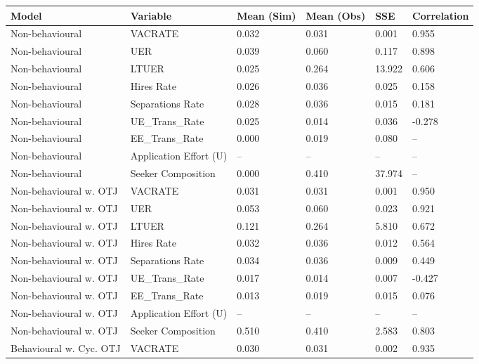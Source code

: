 \begin{table}[ht]
\centering
\begin{adjustbox}{width=\textwidth}
\begin{tabular}{llllll}
\toprule
Model & Variable & Mean (Sim) & Mean (Obs) & SSE & Correlation \\
\midrule
Non-behavioural & VACRATE & 0.032 & 0.031 & \cellcolor{yellow!25}0.001 & \cellcolor{yellow!25}0.955 \\
Non-behavioural & UER & 0.039 & 0.060 & 0.117 & 0.898 \\
Non-behavioural & LTUER & 0.025 & 0.264 & 13.922 & 0.606 \\
Non-behavioural & Hires Rate & 0.026 & 0.036 & 0.025 & 0.158 \\
Non-behavioural & Separations Rate & 0.028 & 0.036 & 0.015 & 0.181 \\
Non-behavioural & UE_Trans_Rate & 0.025 & 0.014 & 0.036 & -0.278 \\
Non-behavioural & EE_Trans_Rate & 0.000 & 0.019 & 0.080 & -- \\
Non-behavioural & Application Effort (U) & -- & -- & -- & -- \\
Non-behavioural & Seeker Composition & 0.000 & 0.410 & 37.974 & -- \\
Non-behavioural w. OTJ & VACRATE & \cellcolor{yellow!25}0.031 & 0.031 & 0.001 & 0.950 \\
Non-behavioural w. OTJ & UER & \cellcolor{yellow!25}0.053 & 0.060 & \cellcolor{yellow!25}0.023 & \cellcolor{yellow!25}0.921 \\
Non-behavioural w. OTJ & LTUER & 0.121 & 0.264 & 5.810 & 0.672 \\
Non-behavioural w. OTJ & Hires Rate & \cellcolor{yellow!25}0.032 & 0.036 & \cellcolor{yellow!25}0.012 & 0.564 \\
Non-behavioural w. OTJ & Separations Rate & \cellcolor{yellow!25}0.034 & 0.036 & \cellcolor{yellow!25}0.009 & 0.449 \\
Non-behavioural w. OTJ & UE_Trans_Rate & 0.017 & 0.014 & 0.007 & -0.427 \\
Non-behavioural w. OTJ & EE_Trans_Rate & \cellcolor{yellow!25}0.013 & 0.019 & \cellcolor{yellow!25}0.015 & 0.076 \\
Non-behavioural w. OTJ & Application Effort (U) & -- & -- & -- & -- \\
Non-behavioural w. OTJ & Seeker Composition & 0.510 & 0.410 & 2.583 & \cellcolor{yellow!25}0.803 \\
Behavioural w. Cyc. OTJ & VACRATE & 0.030 & 0.031 & 0.002 & 0.935 \\

\end{tabular}
\end{adjustbox}
\end{table}
